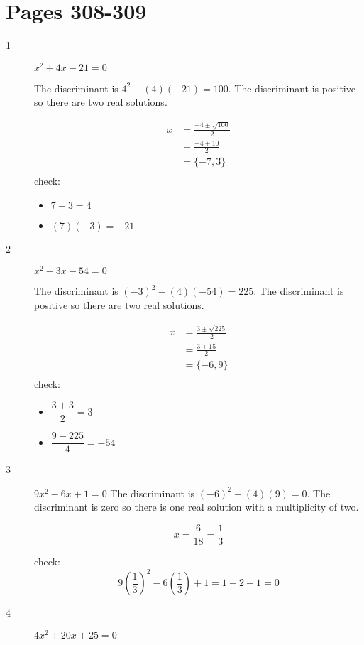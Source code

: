 \documentclass[fleqn,addpoints]{exam}
\begin{document}
\section{Pages 308-309}
\begin{description}

\item[1] \( x^2 + 4x - 21 = 0 \)

The discriminant is \(4^2 - (4)(-21) = 100\).  The discriminant is positive so there are two real solutions.

\begin{align*}
  x &= \frac{-4 \pm \sqrt{100}}{2} \\
  &= \frac{-4 \pm 10}{2} \\
  &= \{ -7, 3 \} \\
\end{align*}
check:
\begin{itemize}
  \item \( 7-3 = 4 \)
  \item \( (7)(-3) = -21 \)
\end{itemize}

\item[2] \( x^2 - 3x - 54 = 0 \)

The discriminant is \( (-3)^2 - (4)(-54) = 225\).  The discriminant is positive so there are two real solutions.

\begin{align*}
  x &= \frac{3 \pm \sqrt{225}}{2} \\
  &= \frac{3 \pm 15}{2} \\
  &= \{-6, 9\} \\
\end{align*}
check:
\begin{itemize}
  \item \( \dfrac{3+3}{2} = 3 \)
  \item \( \dfrac{9 - 225}{4} = -54 \)
\end{itemize}


\item[3] \( 9x^2-6x+1 = 0 \)
The discriminant is \( (-6)^2 - (4)(9) = 0 \).  The discriminant is zero so there is one real solution with a
multiplicity of two. 

\[
  x = \frac{6}{18} = \frac{1}{3}
\]

check: 
\[
  9 \left(\frac{1}{3} \right)^2 - 6 \left( \frac{1}{3} \right) + 1 = 1 - 2 + 1 = 0
\]

\item[4] \( 4x^2 + 20x + 25 = 0 \)


\end{description}
\end{document}

